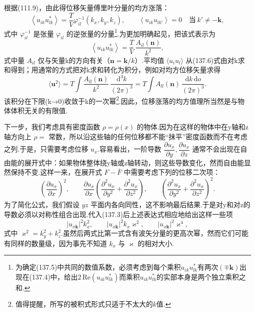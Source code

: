 根据(111.9)，由此得位移矢量傅里叶分量的均方涨落：
\begin{equation}
  \left\langle u_{ik}u_{lk}^{*}\right\rangle
  =\frac{T}{V}\varphi_{il}^{-1}(k_x,k_y,k_z),\qquad
  \left\langle u_{ik}u_{lk'}\right\rangle=0
  \quad\text{当}\ k'\neq-\boldsymbol{k},
\end{equation}
式中 $\varphi_{il}^{-1}$ 是张量 $\varphi_{il}$ 的逆张量的分量\footnote{为确定(137.5)中共同的数值系数，必须考虑到每个乘积$u_{ik}u_{lk}^*$有两次$(\mp\boldsymbol{k})$出现在(137.4)中，给出$2\,\mathrm{Re}(u_{ik}u_{lk}^*)$而乘积$u_{ik}u_{lk}^*$的实部本身是两个独立乘积之和.}.为更加明确起见，把该式表示为
\begin{equation}
  \left\langle u_{ik}u_{lk}^{*}\right\rangle
  =\frac{T}{V}\,\frac{A_{il}(\boldsymbol{n})}{k^2},
\end{equation}
式中量 $A_{il}$ 仅与矢量k的方向有关（$\boldsymbol{n}=\boldsymbol{k}/k$）.平均值 $\langle u_iu_l\rangle$ 从(137.6)式由对k求和得到；用通常的方式把对k求和转化为积分，例如对均方位移矢量求得
\begin{equation}
  \langle\boldsymbol{u}^2\rangle=T\int\frac{A_{ll}(\boldsymbol{n})}{k^2}\,
  \frac{\mathrm{d}^3k}{(2\pi)^3}
  =T\int A_{ll}(\boldsymbol{n})\,\frac{\mathrm{d}k\,\mathrm{d}o}{(2\pi)^3}.
\end{equation}
该积分在下限(k→0)收敛于k的一次幂\footnote{值得提醒，所写的被积式形式只适于不太大的$k$值.}.因此，位移涨落的均方值理所当然是与物体体积无关的有限值.

下一步，我们考虑具有密度函数 $\rho=\rho(x)$ 的物体.因为在这样的物体中在y轴和z轴方向上 $\rho=$ 常数，所以沿这些轴的任何位移都不能“抹平”密度函数而不在考虑之列.于是，只需要考虑位移 $u_x$.容易看出，一阶导数 $\dfrac{\partial u_x}{\partial y},\dfrac{\partial u_x}{\partial z}$ 通常不会出现在自由能的展开式中：如果物体整体绕y轴或z轴转动，则这些导数变化，然而自由能显然保持不变.这样一来，在展开式 $F-\bar{F}$ 中需要考虑下列的位移二次项：
\begin{equation*}
  \left(\frac{\partial u_x}{\partial x}\right)^{2},\qquad
  \frac{\partial u_x}{\partial x}\left(\frac{\partial^2 u_x}{\partial y^2}
  +\frac{\partial^2 u_x}{\partial z^2}\right),\qquad
  \left(\frac{\partial^2 u_x}{\partial y^2}
  +\frac{\partial^2 u_x}{\partial z^2}\right)^{2}.
\end{equation*}
为了简化公式，我们假设 $yz$ 平面内各向同性，这不影响最后结果.于是对y和对z的导数必须以对称性组合出现.代入(137.3)后上述表达式相应地给出这样一些项
\begin{equation*}
  |u_{x\boldsymbol{k}}|^2k_x^2,\qquad
  |u_{x\boldsymbol{k}}|^2k_x\varkappa^2,\qquad
  |u_{x\boldsymbol{k}}|^2\varkappa^4,
\end{equation*}
式中 $\varkappa^2=k_y^2+k_z^2$.虽然后两式比第一式含有波矢分量的更高次幂，然而它们可能有同样的数量级，因为事先不知道 $k_x$ 与 $\varkappa$ 的相对大小.

